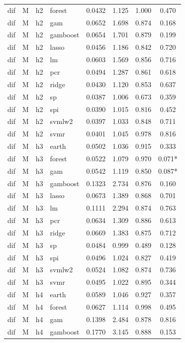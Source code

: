 \begin{ThreePartTable}
\begin{longtable}[t]{llclcccc}
dif & M & h2 & forest & 0.0432 & 1.125 & 1.000 & 0.470\\
dif & M & h2 & gam & 0.0652 & 1.698 & 0.874 & 0.168\\
dif & M & h2 & gamboost & 0.0654 & 1.701 & 0.879 & 0.199\\
dif & M & h2 & lasso & 0.0456 & 1.186 & 0.842 & 0.720\\
dif & M & h2 & lm & 0.0603 & 1.569 & 0.856 & 0.716\\
dif & M & h2 & pcr & 0.0494 & 1.287 & 0.861 & 0.618\\
dif & M & h2 & ridge & 0.0430 & 1.120 & 0.853 & 0.637\\
dif & M & h2 & sp & 0.0387 & 1.006 & 0.673 & 0.359\\
dif & M & h2 & spi & 0.0390 & 1.015 & 0.816 & 0.452\\
dif & M & h2 & svmlw2 & 0.0397 & 1.033 & 0.848 & 0.711\\
dif & M & h2 & svmr & 0.0401 & 1.045 & 0.978 & 0.816\\
\addlinespace
dif & M & h3 & earth & 0.0502 & 1.036 & 0.915 & 0.333\\
dif & M & h3 & forest & 0.0522 & 1.079 & 0.970 & 0.071*\\
dif & M & h3 & gam & 0.0542 & 1.119 & 0.850 & 0.087*\\
dif & M & h3 & gamboost & 0.1323 & 2.734 & 0.876 & 0.160\\
dif & M & h3 & lasso & 0.0673 & 1.389 & 0.868 & 0.701\\
dif & M & h3 & lm & 0.1111 & 2.294 & 0.874 & 0.763\\
dif & M & h3 & pcr & 0.0634 & 1.309 & 0.886 & 0.613\\
dif & M & h3 & ridge & 0.0669 & 1.383 & 0.875 & 0.712\\
dif & M & h3 & sp & 0.0484 & 0.999 & 0.489 & 0.128\\
dif & M & h3 & spi & 0.0496 & 1.024 & 0.827 & 0.419\\
dif & M & h3 & svmlw2 & 0.0524 & 1.082 & 0.874 & 0.736\\
dif & M & h3 & svmr & 0.0495 & 1.022 & 0.895 & 0.344\\
\addlinespace
dif & M & h4 & earth & 0.0589 & 1.046 & 0.927 & 0.357\\
dif & M & h4 & forest & 0.0627 & 1.114 & 0.998 & 0.495\\
dif & M & h4 & gam & 0.1398 & 2.484 & 0.878 & 0.816\\
dif & M & h4 & gamboost & 0.1770 & 3.145 & 0.888 & 0.153\\

\end{longtable}
\end{ThreePartTable}
